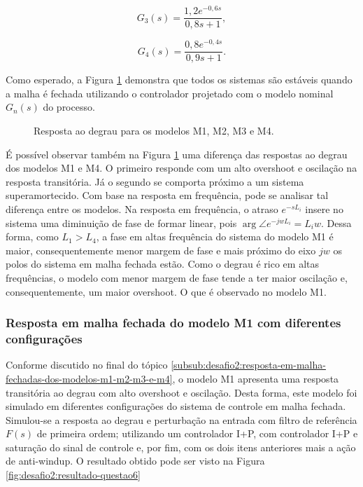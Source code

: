 \begin{equation}
    \label{eq:desafio2:modelo-g3}
    G_{3}(s) = \frac{1,2e^{-0,6s}}{0,8s + 1},
\end{equation}

\begin{equation}
    \label{eq:desafio2:modelo-g4}
    G_{4}(s) = \frac{0,8e^{-0,4s}}{0,9s + 1}.
\end{equation}

Como esperado, a Figura \ref{fig:desafio2:questao5} demonstra que todos os
sistemas são estáveis quando a malha é fechada utilizando o controlador
projetado com o modelo nominal $G_{n}(s)$ do processo.

\begin{figure}[!ht]
    \caption{Resposta ao degrau para os modelos M1, M2, M3 e M4.}
    \vspace{-10pt}
    \hspace{-30pt}
    \label{fig:desafio2:questao5}
    \begin{minipage}{\linewidth}
        
    \end{minipage}
\end{figure}

É possível observar também na Figura \ref{fig:desafio2:questao5} uma diferença
das respostas ao degrau dos modelos M1 e M4. O primeiro responde com um alto
overshoot e oscilação na resposta transitória. Já o segundo se comporta próximo
a um sistema superamortecido. Com base na resposta em frequência, pode se
analisar tal diferença entre os modelos. Na resposta em frequência, o atraso
$e^{-sL_{i}}$ insere no sistema uma diminuição de fase de formar linear, pois
$\arg\angle e^{-jwL_{i}} = L_{i}w$. Dessa forma, como $L_{1} > L_{4}$, a fase em
altas frequência do sistema do modelo M1 é maior, consequentemente menor margem
de fase e mais próximo do eixo $jw$ os polos do sistema em malha fechada estão.
Como o degrau é rico em altas frequências, o modelo com menor margem de fase
tende a ter maior oscilação e, consequentemente, um maior overshoot. O que é
observado no modelo M1.

\subsubsection{Resposta em malha fechada do modelo M1 com diferentes configurações}
Conforme discutido no final do tópico
\ref{subsub:desafio2:resposta-em-malha-fechadas-dos-modelos-m1-m2-m3-e-m4}, o
modelo M1 apresenta uma resposta transitória ao degrau com alto overshoot e
oscilação. Desta forma, este modelo foi simulado em diferentes configurações do
sistema de controle em malha fechada. Simulou-se a resposta ao degrau e
perturbação na entrada com filtro de referência $F(s)$ de primeira ordem;
utilizando um controlador I+P, com controlador I+P e saturação do sinal de
controle e, por fim, com os dois itens anteriores mais a ação de anti-windup. O
resultado obtido pode ser visto na Figura \ref{fig:desafio2:resultado-questao6}

